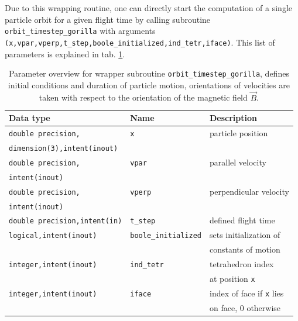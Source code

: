 \documentclass[./main.tex]{subfiles}
\begin{document}
Due to this wrapping routine, one can directly start the computation of a single particle orbit for a given flight time by calling subroutine \texttt{orbit\_timestep\_gorilla} with arguments \texttt{(x,vpar,vperp,t\_step,boole\_initialized,ind\_tetr,iface)}. This list of parameters is explained in tab. \ref{tab:input_orbit_timestep}.

\begin{centering}
	\begin{table}[H]
		
		\caption{Parameter overview for wrapper subroutine \texttt{orbit\_timestep\_gorilla}, defines initial conditions and duration of particle motion, orientations of velocities are taken with respect to the orientation of the magnetic field $\vec{B}$.}
		\begin{tabular}{|l|l|l|}
			\hline
			\rowcolor{lightgray}
			Data type&Name&Description \\
			\hline
			\texttt{double precision,}&\texttt{x}&particle position\\
			\texttt{dimension(3),intent(inout)}&&\\
			\hline
			\texttt{double precision,}&\texttt{vpar}&parallel velocity\\
			\texttt{intent(inout)}&&\\
			\hline
			\texttt{double precision,}&\texttt{vperp}&perpendicular velocity\\
			\texttt{intent(inout)}&&\\
			\hline
			\texttt{double precision,intent(in)}&\texttt{t\_step}&defined flight time\\
			\hline
			\texttt{logical,intent(inout)}&\texttt{boole\_initialized}&sets initialization of\\
			&&constants of motion\\
			\hline
			\texttt{integer,intent(inout)}&\texttt{ind\_tetr}&tetrahedron index \\
			&&at position \texttt{x}\\
			
			\hline
			\texttt{integer,intent(inout)}&\texttt{iface}&index of face if \texttt{x} lies \\
			&&on face, 0 otherwise\\
			\hline
		\end{tabular}
		\label{tab:input_orbit_timestep}	
	\end{table}
\end{centering}
\end{document}
